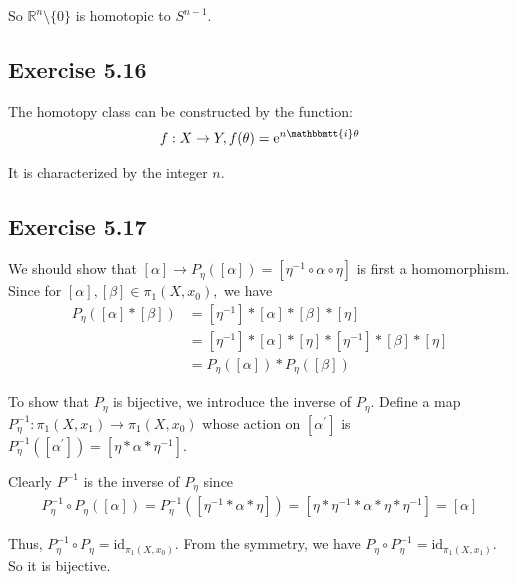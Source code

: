 \documentclass[]{ctexart}
\newcommand{\mi}{\mathbbmtt{i}}
\newcommand{\me}{\mathrm{e}}
\begin{document}
		So $\mathbb{R}^n\setminus \{0\}$ is homotopic to $S^{n-1}$. 
	
	\subsection{Exercise 5.16}
		The homotopy class can be constructed by the function:
			\begin{equation*}
			\begin{aligned}
				f:X\to Y,f(\theta)=\me^{n \mi \theta}
			\end{aligned}
			\end{equation*}
		
		It is characterized by the integer $n$. 
	\subsection{Exercise 5.17}
		We should show that $[\alpha]\to P_{\eta}([\alpha])=[\eta^{-1} \circ \alpha \circ \eta]$ is first a homomorphism. Since for $[\alpha],[\beta] \in \pi_{1}\left(X, x_{0}\right),$ we have
			\begin{equation*}
			\begin{aligned}
			P_{\eta}([\alpha] *[\beta]) &=\left[\eta^{-1}\right] *[\alpha] *[\beta] *[\eta] \\
			&=\left[\eta^{-1}\right] *[\alpha] *[\eta] *\left[\eta^{-1}\right] *[\beta] *[\eta] \\
			&=P_{\eta}([\alpha]) * P_{\eta}([\beta])
			\end{aligned}
			\end{equation*}
		
		To show that $P_{\eta}$ is bijective, we introduce the inverse of $P_{\eta} .$ Define a map $P_{\eta}^{-1}: \pi_{1}\left(X, x_{1}\right) \rightarrow \pi_{1}\left(X, x_{0}\right)$ whose action on $\left[\alpha^{\prime}\right]$ is $P_{\eta}^{-1}\left(\left[\alpha^{\prime}\right]\right)=\left[\eta * \alpha * \eta^{-1}\right]$.
		
		Clearly $P^{-1}$ is the inverse of $P_{\eta}$ since
			\begin{equation*}
			\begin{aligned}
				P_{\eta}^{-1} \circ P_{\eta}([\alpha])=P_{\eta}^{-1}\left(\left[\eta^{-1} * \alpha * \eta\right]\right)=\left[\eta * \eta^{-1} * \alpha * \eta * \eta^{-1}\right]=[\alpha]
			\end{aligned}
			\end{equation*}
		
		Thus, $P_{\eta}^{-1} \circ P_{\eta}=\mathrm{id}_{\pi_{1}\left(X, x_{0}\right)} .$ From the symmetry, we have $P_{\eta} \circ P_{\eta}^{-1}=\mathrm{id}_{\pi_{1}\left(X, x_{1}\right)}$.
		So it is bijective. 
	
\end{document}
